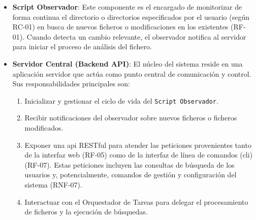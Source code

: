 \begin{itemize}
    \item \textbf{Script Observador}:
    Este componente es el encargado de monitorizar de forma continua el directorio o directorios especificados por el usuario (según RC-01) en busca de nuevos ficheros o modificaciones en los existentes (RF-01). Cuando detecta un cambio relevante, el observador notifica al servidor para iniciar el proceso de análisis del fichero.

    \item \textbf{Servidor Central (Backend API)}:
    El núcleo del sistema reside en una aplicación servidor que actúa como punto central de comunicación y control. Sus responsabilidades principales son:
    \begin{enumerate}
        \item Inicializar y gestionar el ciclo de vida del \texttt{Script Observador}.
        \item Recibir notificaciones del observador sobre nuevos ficheros o ficheros modificados.
        \item Exponer una \gls{api} RESTful para atender las peticiones provenientes tanto de la interfaz web (RF-05) como de la interfaz de línea de comandos (\gls{cli}) (RF-07). Estas peticiones incluyen las consultas de búsqueda de los usuarios y, potencialmente, comandos de gestión y configuración del sistema (RNF-07).
        \item Interactuar con el Orquestador de Tareas para delegar el procesamiento de ficheros y la ejecución de búsquedas.
    \end{enumerate}


\end{itemize}
